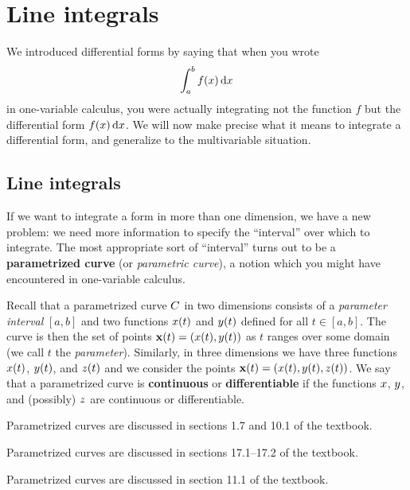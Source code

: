 \ifdefined\inmaster\else\def\subonly{\jobname}\fi

\chapter{Line integrals}
\label{cha:line-integrals}

We introduced differential forms by saying that when you wrote
\[ \itint x a b {f(x)} \]
in one-variable calculus, you were actually integrating not the function $f$ but the differential form $f(x)\,\dx$.
We will now make precise what it means to integrate a differential form, and generalize to the multivariable situation.

\section{Line integrals}
\label{sec:line-integrals}

If we want to integrate a form in more than one dimension, we have a new problem: we need more information to specify the ``interval'' over which to integrate.
The most appropriate sort of ``interval'' turns out to be a \textbf{parametrized curve} (or \emph{parametric curve}), a notion which you might have encountered in one-variable calculus.

Recall that a parametrized curve $\curve$ in two dimensions consists of a \emph{parameter interval} $[a,b]$ and two functions $\curvex(t)$ and $\curvey(t)$ defined for all $t\in [a,b]$.
The curve is then the set of points $\curvept(t) = (\curvex(t),\curvey(t))$ as $t$ ranges over some domain (we call $t$ the \emph{parameter}).
Similarly, in three dimensions we have three functions $\curvex(t)$, $\curvey(t)$, and $\curvez(t)$ and we consider the points $\curvept(t) = (\curvex(t),\curvey(t),\curvez(t))$.
We say that a parametrized curve is \textbf{continuous} or \textbf{differentiable} if the functions $\curvex$, $\curvey$, and (possibly) $\curvez$ are continuous or differentiable.
\begin{stewart}Parametrized curves are discussed in sections 1.7 and 10.1 of the textbook.\end{stewart}%
\begin{hugheshallett}Parametrized curves are discussed in sections 17.1--17.2 of the textbook.\end{hugheshallett}%
\begin{rogawski}Parametrized curves are discussed in section 11.1 of the textbook.\end{rogawski}%

